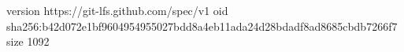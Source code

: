 version https://git-lfs.github.com/spec/v1
oid sha256:b42d072e1bf9604954955027bdd8a4eb11ada24d28bdadf8ad8685cbdb7266f7
size 1092
